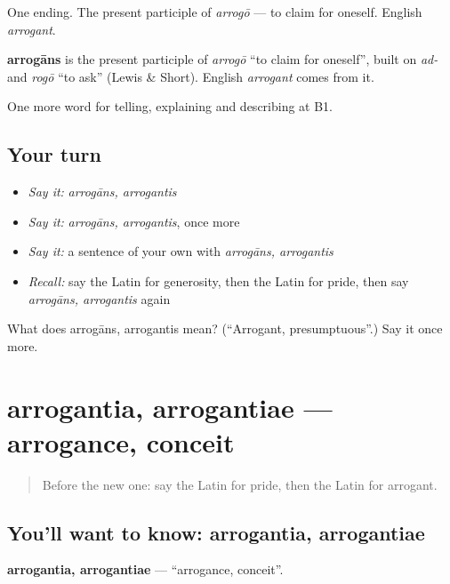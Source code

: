 One ending. The present participle of \emph{arrogō} — to claim for oneself. English \emph{arrogant}.

\begin{cousinweb}
\textbf{arrogāns} is the present participle of \emph{arrogō} \textquotedblleft{}to claim for oneself\textquotedblright{}, built on \emph{ad-} and \emph{rogō} \textquotedblleft{}to ask\textquotedblright{} (Lewis \& Short). English \emph{arrogant} comes from it.
\end{cousinweb}

\begin{grammarlens}[title={What you've built}]
One more word for telling, explaining and describing at B1.
\end{grammarlens}

\subsection*{Your turn}
\begin{itemize}
\raggedright
  \item \emph{Say it:} \emph{arrogāns, arrogantis}
  \item \emph{Say it:} \emph{arrogāns, arrogantis}, once more
  \item \emph{Say it:} a sentence of your own with \emph{arrogāns, arrogantis}
  \item \emph{Recall:} say the Latin for generosity, then the Latin for pride, then say \emph{arrogāns, arrogantis} again
\end{itemize}

\begin{tcolorbox}[breakable,colback=teal!4,colframe=teal!35!black,title={Before you move on}]
What does arrogāns, arrogantis mean? (\textquotedblleft{}Arrogant, presumptuous\textquotedblright{}.) Say it once more.
\end{tcolorbox}
\section[arrogantia, arrogantiae]{arrogantia, arrogantiae — arrogance, conceit}

\label{lesson:LA-C507-arrogantia}



\begin{quote}
Before the new one: say the Latin for pride, then the Latin for arrogant.
\end{quote}

\subsection*{You'll want to know: arrogantia, arrogantiae}
\textbf{arrogantia, arrogantiae} — \textquotedblleft{}arrogance, conceit\textquotedblright{}.

